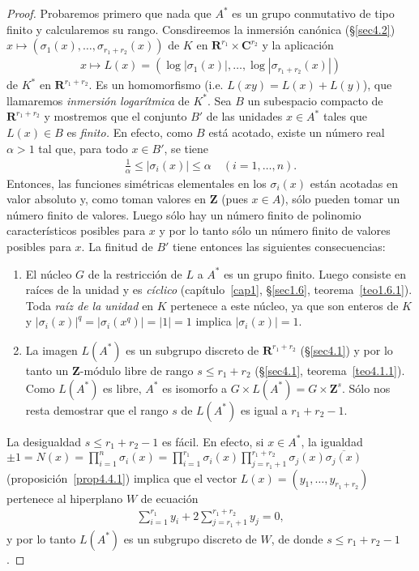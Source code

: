 \documentclass[oneside,bibtotoc,leqno,spanish]{amsbook}
\newcommand{\RR}{\mathbf{R}}
\newcommand{\ZZ}{\mathbf{Z}}
\newcommand{\CC}{\mathbf{C}}
\newcommand{\oline}[1]{\overline{#1}}
\newcommand{\abs}[1]{\left\lvert#1\right\rvert}
\numberwithin{equation}{section}
\theoremstyle{defi}
\theoremstyle{note}
\theoremstyle{rem}
\numberwithin{theorem}{section}
\numberwithin{proposition}{section}
\numberwithin{definition}{section}
\numberwithin{lemma}{section}
\numberwithin{corollary}{section}
\numberwithin{example}{section}
\numberwithin{footnote}{section}%
\begin{document}
\begin{proof}
Probaremos primero que nada que $A^{*}$ es un grupo conmutativo de tipo finito y calcularemos su rango.
Consdireemos la inmersi\'on can\'onica (\S\ref{sec4.2}) $x\mapsto(\sigma_{1}(x),\dots,\sigma_{r_{1}+r_{2}}(x))$
de $K$ en $\RR^{r_{1}}\times\CC^{r_{2}}$ y la aplicaci\'on
\begin{gather}
x\mapsto L(x) = (\log\abs{\sigma_{1}(x)},\dots,\log\abs{\sigma_{r_{1}+r_{2}}(x)})
\end{gather}
de $K^{*}$ en $\RR^{r_{1}+r_{2}}$. Es un homomorfismo (i.e. $L(xy) = L(x)+L(y)$), que llamaremos
{\em inmersi\'on logar\'itmica} de $K^{*}$. Sea $B$ un subespacio compacto de $\RR^{r_{1}+r_{2}}$ y
mostremos que el conjunto $B'$ de las unidades $x\in A^{*}$ tales que $L(x)\in B$ es {\em finito.} En
efecto, como $B$ est\'a acotado, existe un n\'umero real $\alpha > 1$ tal que, para todo $x\in B'$, se tiene
\begin{gather*}
\frac{1}{\alpha}\leq\abs{\sigma_{i}(x)}\leq\alpha\quad(i=1,\dots,n).
\end{gather*}
Entonces, las funciones sim\'etricas elementales en los $\sigma_{i}(x)$ est\'an acotadas en valor absoluto
y, como toman valores en $\ZZ$ (pues $x\in A$), s\'olo pueden tomar un n\'umero finito de valores. Luego
s\'olo hay un n\'umero finito de polinomio caracter\'isticos posibles para $x$ y por lo tanto s\'olo un n\'umero
finito de valores posibles para $x$. La finitud de $B'$ tiene entonces las siguientes consecuencias:
\begin{enumerate}
\item El n\'ucleo $G$ de la restricci\'on de $L$ a $A^{*}$ es un grupo finito. Luego consiste en ra\'ices de
la unidad y es {\em c\'iclico} (cap\'itulo~\ref{cap1}, \S\ref{sec1.6}, teorema~\ref{teo1.6.1}). Toda {\em ra\'iz de la unidad} en $K$ pertenece
a este n\'ucleo, ya que son enteros de $K$ y $\abs{\sigma_{i}(x)}^{q}=\abs{\sigma_{i}(x^{q})}=\abs{1}=1$
implica $\abs{\sigma_{i}(x)}=1$.
\item La imagen $L(A^{*})$ es un subgrupo discreto de $\RR^{r_{1}+r_{2}}$ (\S\ref{sec4.1}) y por lo tanto un
$\ZZ$-m\'odulo libre de rango $s\leq r_{1}+r_{2}$ (\S\ref{sec4.1}, teorema~\ref{teo4.1.1}). Como $L(A^{*})$ es libre, $A^{*}$
es isomorfo a $G\times L(A^{*}) = G\times\ZZ^{s}$. S\'olo nos resta demostrar que el rango $s$ de $L(A^{*})$
es igual a $r_{1}+r_{2}-1$.
\end{enumerate}
La desigualdad $s\leq r_{1}+r_{2}-1$ es f\'acil. En efecto, si $x\in A^{*}$, la igualdad
$\pm 1=N(x) = \prod_{i=1}^{n}\sigma_{i}(x) = \prod_{i=1}^{r_{1}}\sigma_{i}(x)\prod_{j=r_{1}+1}^{r_{1}+r_{2}}
\sigma_{j}(x)\oline{\sigma_{j}(x)}$ (proposici\'on~\ref{prop4.4.1})
implica que el vector $L(x) = (y_{1},\dots,y_{r_{1}+r_{2}})$
pertenece al hiperplano $W$ de ecuaci\'on
\begin{gather}\label{eq-4.4-2}
\sum_{i=1}^{r_{1}}y_{i}+2\sum_{j=r_{1}+1}^{r_{1}+r_{2}}y_{j} = 0,
\end{gather}
y por lo tanto $L(A^{*})$ es un subgrupo discreto de $W$, de donde $s\leq r_{1}+r_{2}-1$.


\end{proof}
\end{document}
